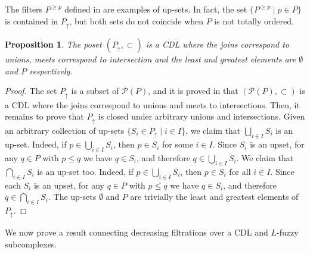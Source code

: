 \documentclass[a4paper,10pt]{article}
\newtheorem{proposition}[theorem]{Proposition}
\newcommand{\calp}{\mathcal{P}}
\begin{document}
The filters \(P^{\geq p}\) defined in  are examples of up-sets. In fact, the set \(\{P^{\geq p} \mid p \in P\}\) is contained in \(P_\uparrow\), but both sets do not coincide when \(P\) is not totally ordered.

\begin{proposition}
\label{prop:upsetcdl}
The poset \((P_\uparrow, \subset)\) is a CDL where the joins correspond to unions, meets correspond to intersection and the least and greatest elements are \(\emptyset\) and \(P\) respectively.
\end{proposition}

\begin{proof}
The set \(P_\uparrow\) is a subset of \(\calp(P)\), and it is proved in \cite[Theorem 10.24]{davey2002introduction} that \((\calp(P), \subset)\) is a CDL where the joins correspond to unions and meets to intersections. Then, it remains to prove that \(P_\uparrow\) is closed under arbitrary unions and intersections. Given an arbitrary collection of up-sets \(\{S_i \in P_\uparrow \mid i \in I\}\), we claim that \(\bigcup_{i \in I} S_i\) is an up-set. Indeed, if \(p \in \bigcup_{i \in I}S_i\), then \(p \in S_i\) for some \(i \in I\). Since \(S_i\) is an upset, for any \(q \in P\) with \(p \le q\) we have \(q \in S_i\), and therefore \(q \in \bigcup_{i \in I}S_i\). We claim that \(\bigcap_{i \in I}S_i\) is an up-set too. Indeed, if \(p \in \bigcup_{i \in I}S_i\), then \(p \in S_i\) for all \(i \in I\). Since each \(S_i\) is an upset, for any \(q \in P\) with \(p \le q\) we have \(q \in S_i\), and therefore \(q \in \bigcap_{i \in I}S_i\). The up-sets \(\emptyset\) and \(P\) are trivially the least and greatest elements of \(P_\uparrow\).   
\end{proof}

We now prove a result connecting decreasing filtrations over a CDL and \(L\)-fuzzy subcomplexes.
\end{document}
